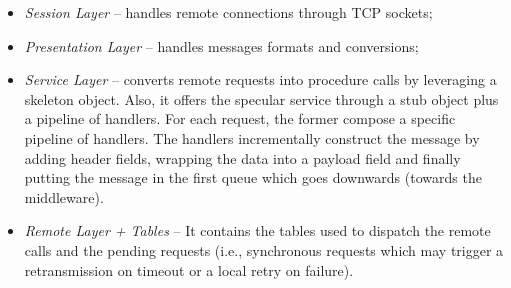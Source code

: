 \begin{itemize}
  \item \textit{Session Layer} --
  handles remote connections through TCP sockets;
  \item \textit{Presentation Layer} --
  handles messages formats and conversions;
  \item \textit{Service Layer} --
  converts remote requests into procedure calls
  by leveraging a skeleton object.
  Also, it offers the specular service through a stub object plus a pipeline
  of handlers. For each request, the former compose a specific pipeline
  of handlers. The handlers incrementally construct the message by adding
  header fields, wrapping the data into a payload field and finally putting
  the message in the first queue which goes downwards (towards the middleware).
  \item \textit{Remote Layer + Tables} --
  It contains the tables used
  to dispatch the remote calls and the pending requests (i.e., synchronous
  requests which may trigger a retransmission on timeout or a local retry on
  failure).
\end{itemize}




